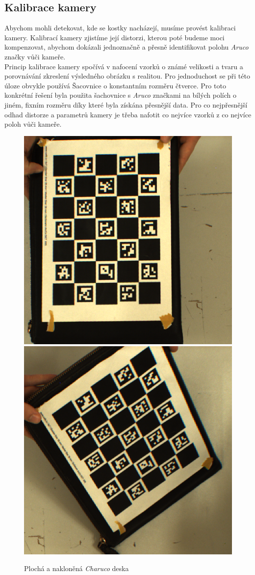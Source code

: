 \documentclass[journal,twoside,web]{ieeecolor}
\begin{document}
\subsection{Kalibrace kamery}
    Abychom mohli detekovat, kde se kostky nacházejí, musíme provést kalibraci kamery. Kalibrací
    kamery zjistíme její distorzi, kterou poté budeme moci kompenzovat, abychom dokázali jednoznačně
    a přesně identifikovat polohu \textit{Aruco} značky vůči kameře.\\
    Princip kalibrace kamery spočívá v nafocení vzorků o známé velikosti a tvaru a porovnávání
    zkreslení výsledného obrázku s realitou. Pro jednoduchost se při této úloze obvykle používá
    Šacovnice o konstantním rozměru čtverce. Pro toto konkrétní řešení byla použita šachovnice
    s \textit{Aruco} značkami na bílých polích o jiném, fixním rozměru díky které byla získána
    přesnější data. Pro co nejpřesnější odhad distorze a parametrů kamery je třeba nafotit co nejvíce
    vzorků z co nejvíce poloh vůči kameře.
    \begin{figure}[h!]
        \centering
          \includegraphics[width=0.45\linewidth]{images/CharucoFlat.png}
          \includegraphics[width=0.45\linewidth]{images/CharucoSkewed.png}
        \caption{Plochá a nakloněná \textit{Charuco} deska}
        \label{fig:CharucoBoard}
    \end{figure}\\
\end{document}
